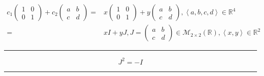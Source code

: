 \documentclass[
]{book}
\theoremstyle{definition}
\theoremstyle{definition}
\theoremstyle{definition}
\theoremstyle{definition}
\theoremstyle{remark}
\begin{document}
\[
\begin{aligned}
c_{{\scriptscriptstyle 1}}\begin{pmatrix}1 & 0\\
0 & 1
\end{pmatrix}+c_{{\scriptscriptstyle 2}}\begin{pmatrix}a & b\\
c & d
\end{pmatrix}= & x\begin{pmatrix}1 & 0\\
0 & 1
\end{pmatrix}+y\begin{pmatrix}a & b\\
c & d
\end{pmatrix},\left\langle a,b,c,d\right\rangle \in\mathbb{R}^{4}\\
= & xI+yJ,J=\begin{pmatrix}a & b\\
c & d
\end{pmatrix}\in\mathcal{M}_{2\times2}\left(\mathbb{R}\right),\left\langle x,y\right\rangle \in\mathbb{R}^{2}
\end{aligned}
\]

\begin{center}\rule{0.5\linewidth}{0.5pt}\end{center}

\[
J^{2}=-I
\]

\begin{center}\rule{0.5\linewidth}{0.5pt}\end{center}
\end{document}
